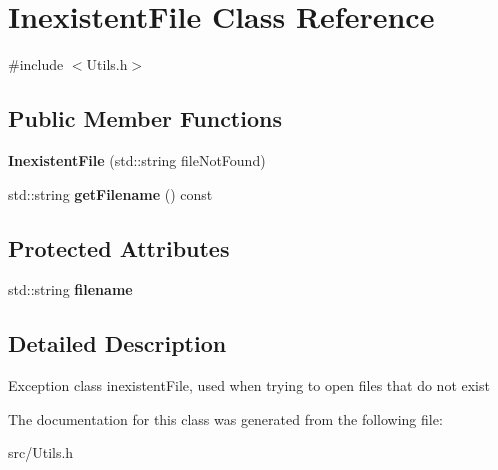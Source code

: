 \hypertarget{class_inexistent_file}{}\section{Inexistent\+File Class Reference}
\label{class_inexistent_file}


{\ttfamily \#include $<$Utils.\+h$>$}

\subsection*{Public Member Functions}
\begin{DoxyCompactItemize}
\item 
\hypertarget{class_inexistent_file_a7aa184e6269700f9575cb53654d9b78a}{}\label{class_inexistent_file_a7aa184e6269700f9575cb53654d9b78a} 
{\bfseries Inexistent\+File} (std\+::string file\+Not\+Found)
\item 
\hypertarget{class_inexistent_file_a5df49828741cacd44eb2e73192a8bd85}{}\label{class_inexistent_file_a5df49828741cacd44eb2e73192a8bd85} 
std\+::string {\bfseries get\+Filename} () const
\end{DoxyCompactItemize}
\subsection*{Protected Attributes}
\begin{DoxyCompactItemize}
\item 
\hypertarget{class_inexistent_file_a258dcc13f7d80a5dd0cc2d4d0f48d411}{}\label{class_inexistent_file_a258dcc13f7d80a5dd0cc2d4d0f48d411} 
std\+::string {\bfseries filename}
\end{DoxyCompactItemize}


\subsection{Detailed Description}
Exception class inexistent\+File, used when trying to open files that do not exist 

The documentation for this class was generated from the following file\+:\begin{DoxyCompactItemize}
\item 
src/Utils.\+h\end{DoxyCompactItemize}

